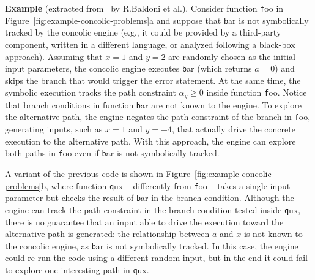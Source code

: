 \vspace{+10pt} 
\textbf{Example} (extracted from~\cite{Baldoni:2018:SSE:3212709.3182657} by R.Baldoni et al.).
	Consider function {\texttt foo} in Figure~\ref{fig:example-concolic-problems}a and suppose that {\texttt bar} is not symbolically tracked by the concolic engine (e.g., it could be provided by a third-party component, written in a different language, or analyzed following a black-box approach). Assuming that $x = 1$ and $y = 2$ are randomly chosen as the initial input parameters, the concolic engine executes {\texttt bar} (which returns $a = 0$) and skips the branch that would trigger the error statement. At the same time, the symbolic execution tracks the path constraint $\alpha_y \geq 0$ inside function {\texttt foo}. Notice that branch conditions in function {\texttt bar} are not known to the engine. To explore the alternative path, the engine negates the path constraint of the branch in {\texttt foo}, generating inputs, such as $x = 1$ and $y = -4$, that actually drive the concrete execution to the alternative path. With this approach, the engine can explore both paths in {\texttt foo} even if {\texttt bar} is not symbolically tracked. 
	
	A variant of the previous code is shown in Figure~\ref{fig:example-concolic-problems}b, where function {\texttt qux} -- differently from {\texttt foo} -- takes a single input parameter but checks the result of {\texttt bar} in the branch condition. Although the engine can track the path constraint in the branch condition tested inside {\texttt qux}, there is no guarantee that an input able to drive the execution toward the alternative path is generated: the relationship between $a$ and $x$ is not known to the concolic engine, as {\texttt bar} is not symbolically tracked. In this case, the engine could re-run the code using a different random input, but in the end it could fail to explore one interesting path in {\texttt qux}. 
	
